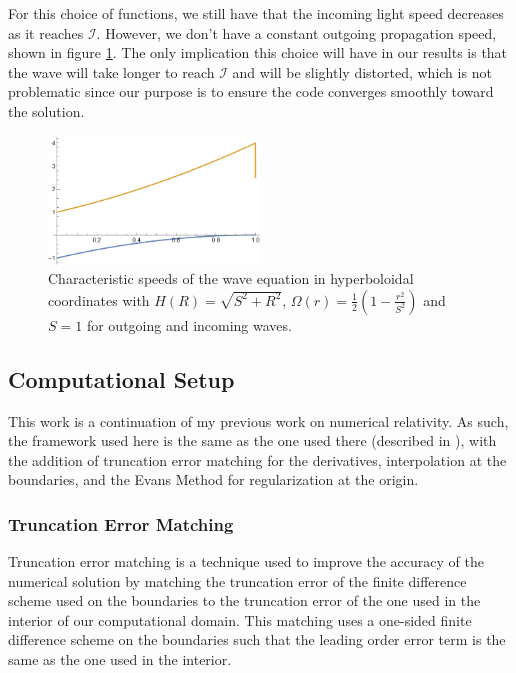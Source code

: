For this choice of functions, we still have that the incoming light speed decreases as it reaches $\mathscr{I}$. However, we don't have a constant outgoing propagation speed, shown in figure \ref{fig:Bad_Speeds}. The only implication this choice will have in our results is that the wave will take longer to reach $\mathscr{I}$ and will be slightly distorted, which is not problematic since our purpose is to ensure the code converges smoothly toward the solution.

\begin{figure}[h]
    \centering
    \includegraphics[width=0.5\textwidth]{Images/Bad_Speeds.png}
    \caption{Characteristic speeds of the wave equation in hyperboloidal coordinates with $H(R) = \sqrt{S^2+R^2}$, $\Omega(r) = \frac{1}{2} \left(1 - \frac{r^2}{S^2}\right)$ and $S = 1$ for outgoing and incoming waves.}
    \label{fig:Bad_Speeds}
\end{figure}

\subsection{Computational Setup}

This work is a continuation of my previous work on numerical relativity. As such, the framework used here is the same as the one used there (described in \cite{}), with the addition of truncation error matching for the derivatives, interpolation at the boundaries, and the Evans Method for regularization at the origin.

\subsubsection{Truncation Error Matching}

Truncation error matching is a technique used to improve the accuracy of the numerical solution by matching the truncation error of the finite difference scheme used on the boundaries to the truncation error of the one used in the interior of our computational domain. This matching uses a one-sided finite difference scheme on the boundaries such that the leading order error term is the same as the one used in the interior.

